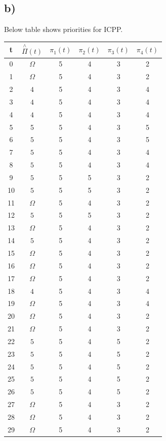 \documentclass[10pt,a4paper]{article}
\begin{document}
\subsection*{b)}
Below table shows priorities for ICPP.
\begin{center}
 \begin{tabular}{||c c c c c c||} 
 \hline
 t & $\overset{\mathrm{\wedge}}{\Pi}(t)$ & $\pi_1(t)$
 & $\pi_2(t)$ & $\pi_3(t)$ & $\pi_4(t)$  \\ [0.5ex] 
 \hline\hline
 0 & $\Omega$ & 5 & 4 & 3 & 2 \\ 
 \hline
 1 & $\Omega$ & 5 & 4 & 3 & 2 \\
 \hline
 2 & $4$& 5 & 4 & 3 & 4  \\
 \hline
 3 & $4$ & 5 & 4 & 3 & 4  \\
 \hline
 4 & $4$ & 5 & 4 & 3 & 4  \\
 \hline
 5 & 5 & 5 & 4 & 3 & 5  \\
 \hline
 6 & $5$ & 5 & 4 & 3 & 5  \\
 \hline
 7 & $5$ & 5 & 4 & 3 & 4  \\
 \hline
 8 & $5$ & 5 & 4 & 3 & 4  \\
 \hline
 9 & $5$ & 5 & 5 & 3 & 2 \\
 \hline
 10 & $5$ & 5 & 5 & 3 & 2 \\
 \hline
 11 & $\Omega$ & 5 & 4 & 3 & 2 \\
 \hline
 12 & $5$ & 5 & 5 & 3 & 2 \\
 \hline
 13 & $\Omega$ & 5 & 4 & 3 & 2 \\
 \hline
 14 & $5$ & 5 & 4 & 3 & 2 \\
 \hline
 15 & $\Omega$ & 5 & 4 & 3 & 2 \\
 \hline
 16 & $\Omega$ & 5 & 4 & 3 & 2 \\
 \hline
 17 & $\Omega$ & 5 & 4 & 3 & 2 \\
 \hline
 18 & $4$ & 5 & 4 & 3 & 4 \\
 \hline
 19 & $\Omega$ & 5 & 4 & 3 & 4 \\
 \hline
 20 & $\Omega$ & 5 & 4 & 3 & 2 \\
 \hline
 21 & $\Omega$ & 5 & 4 & 3 & 2 \\
 \hline
 22 & $5$ & 5 & 4 & 5 & 2 \\
 \hline
 
 23 & $5$ & 5 & 4 & 5 & 2 \\
 \hline
 24 & $5$ & 5 & 4 & 5 & 2 \\
 \hline
 25 & $5$ & 5 & 4 & 5 & 2 \\
 \hline
 26 & $5$ & 5 & 4 & 5 & 2 \\
 \hline
 27 & $\Omega$ & 5 & 4 & 3 & 2 \\
 \hline
 28 & $\Omega$ & 5 & 4 & 3 & 2 \\
 \hline
 29 & $\Omega$ & 5 & 4 & 3 & 2 \\
 [1ex] 
 \hline
\end{tabular}
\end{center}
 
\end{document}
